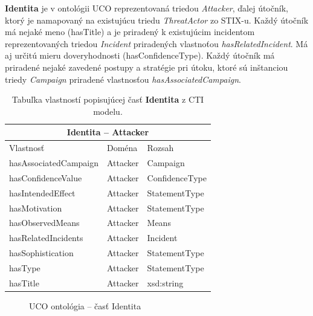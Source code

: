 \documentclass[12pt, a4paper, oneside]{book}
\begin{document}
\textbf{Identita} je v ontológii UCO reprezentovaná triedou \textit{Attacker}, ďalej útočník, ktorý je namapovaný na existujúcu triedu \textit{ThreatActor} zo STIX-u.
%
%
Každý útočník má nejaké meno (hasTitle) a je priradený k existujúcim incidentom reprezentovaných triedou \textit{Incident} priradených vlastnoťou \textit{hasRelatedIncident}. Má aj určitú mieru doveryhodnosti (hasConfidenceType). Každý útočník má priradené nejaké zavedené postupy a stratégie pri útoku, ktoré sú inštanciou triedy \textit{Campaign} priradené vlastnosťou \textit{hasAssociatedCampaign}.
%
%
\begin{table}[hbt!]
\centering
\begin{tabular}{ |p{5cm}||p{3cm}|p{3cm}|  }
 \hline
 \multicolumn{3}{|c|}{Identita -- Attacker} \\
 \hline
 Vlastnosť & Doména & Rozsah\\
 \hline
 hasAssociatedCampaign & Attacker & Campaign\\
 hasConfidenceValue & Attacker & ConfidenceType\\
 hasIntendedEffect & Attacker & StatementType\\
 hasMotivation & Attacker & StatementType\\
 hasObservedMeans & Attacker & Means\\
 hasRelatedIncidents & Attacker & Incident\\
 hasSophistication & Attacker & StatementType\\
 hasType & Attacker & StatementType\\
 hasTitle & Attacker & xsd:string\\
 \hline
\end{tabular}
\caption{Tabuľka vlastností popisujúcej časť \textbf{Identita} z CTI modelu.}
\label{tab:template}
\end{table}
\begin{figure}[!hb]
\label{fig:ucoIdentita}
\caption{UCO ontológia -- časť Identita}
\end{figure}
\end{document}
